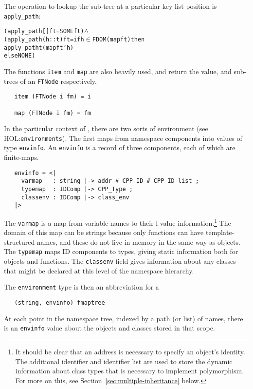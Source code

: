 \documentclass[11pt]{article}
\newcommand{\HOLfile}[1]{HOL:\texttt{#1}}
\begin{document}
The operation to lookup the sub-tree at a particular key list position
is \texttt{apply_path}:
\begin{alltt}
  (apply_path [] ft = SOME ft) \(\land\)
  (apply_path (h::t) ft = if h \(\in\) FDOM (map ft) then
                             apply_path t (map ft ' h)
                          else NONE)

\end{alltt}

The functions \texttt{item} and \texttt{map} are also heavily used,
and return the value, and sub-trees of an \texttt{FTNode}
respectively.
\begin{verbatim}
   item (FTNode i fm) = i

   map (FTNode i fm) = fm
\end{verbatim}

In the particular context of \cpp{}, there are two sorts of
environment (see \HOLfile{environments}).  The first maps from
namespace components into values of type \texttt{envinfo}.  An
\texttt{envinfo} is a record of three components, each of which are
finite-maps.
\begin{verbatim}
   envinfo = <|
     varmap   : string |-> addr # CPP_ID # CPP_ID list ;
     typemap  : IDComp |-> CPP_Type ;
     classenv : IDComp |-> class_env
   |>
\end{verbatim}
The \texttt{varmap} is a map from variable names to their l-value
information.\footnote{It should be clear that an address is necessary
  to specify an object's identity.  The additional identifier and
  identifier list are used to store the dynamic information about
  class types that is necessary to implement polymorphism.  For more
  on this, see Section~\ref{sec:multiple-inheritance} below.}  The
domain of this map can be strings because only functions can have
template-structured names, and these do not live in memory in the same
way as objects.  The \texttt{typemap} maps ID components to types,
giving static information both for objects and functions.  The
\texttt{classenv} field gives information about any classes that might
be declared at this level of the namespace hierarchy.

The \texttt{environment} type is then an abbreviation for a
\begin{verbatim}
   (string, envinfo) fmaptree
\end{verbatim}
At each point in the namespace tree, indexed by a path (or list) of
names, there is an \texttt{envinfo} value about the objects and
classes stored in that scope.
\end{document}
